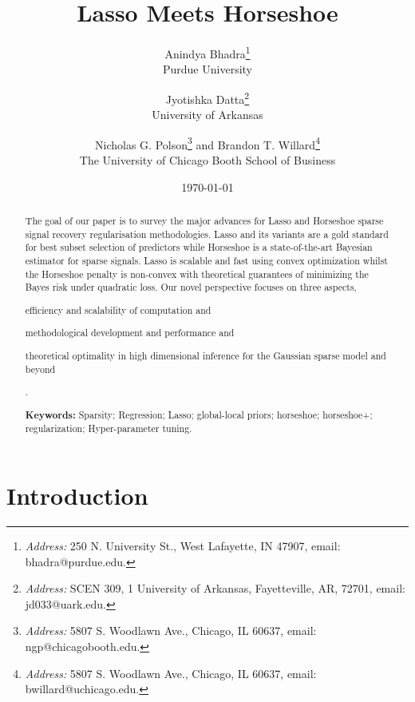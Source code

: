 \documentclass[11pt]{article}
\title{Lasso Meets Horseshoe}
\author{
  Anindya Bhadra\footnote{
  {\em Address:} 250 N. University St., West Lafayette, IN 47907, 
  email: bhadra@purdue.edu.} \\
  Purdue University
  \and Jyotishka Datta\footnote{
  {\em Address:} SCEN 309, 1 University of Arkansas, Fayetteville, AR, 72701, 
  email: jd033@uark.edu.}\\ 
  University of Arkansas \\
  \and Nicholas G. Polson\footnote{
  {\em Address:} 5807 S. Woodlawn Ave., Chicago, IL 60637, 
  email: ngp@chicagobooth.edu.}  
  and 
  Brandon T. Willard\footnote{
  {\em Address:} 5807 S. Woodlawn Ave., Chicago, IL 60637, 
  email: bwillard@uchicago.edu.} \\
  The University of Chicago Booth School of Business
}
\date{\today}
\begin{document}
\maketitle
\onehalfspacing


\begin{abstract}
\baselineskip=15pt
\noindent %
The goal of our paper is to survey the major advances for Lasso and Horseshoe sparse signal recovery regularisation methodologies. Lasso and its variants are a gold standard for best subset selection of predictors while Horseshoe is a state-of-the-art Bayesian estimator for sparse signals. Lasso is scalable and fast using convex optimization whilst the Horseshoe penalty is non-convex with theoretical guarantees of minimizing the Bayes risk under quadratic loss.  Our novel perspective focuses on three aspects, 
\begin{enumerate*}
  \item efficiency and scalability of computation and 
  \item methodological development and performance and 
  \item theoretical optimality in high dimensional inference for the Gaussian
    sparse model and beyond
\end{enumerate*}. 


{\bf Keywords:} Sparsity; Regression; Lasso; global-local priors; horseshoe; horseshoe+; regularization; Hyper-parameter tuning. 
\end{abstract}

\section{Introduction}

\end{document}
